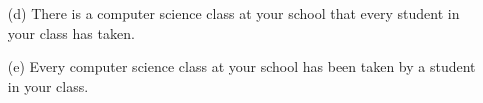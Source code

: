 \documentclass[12pt,addpoints]{exam}
\begin{document}
\begin{questions}
\begin{solution}
\begin{itemize}
        \item[(d)] There is a computer science class at your school that every student in your class has taken.
        \item[(e)] Every computer science class at your school has been taken by a student in your class.
    \end{itemize}
    \end{solution}
    

\end{questions}
\end{document}
